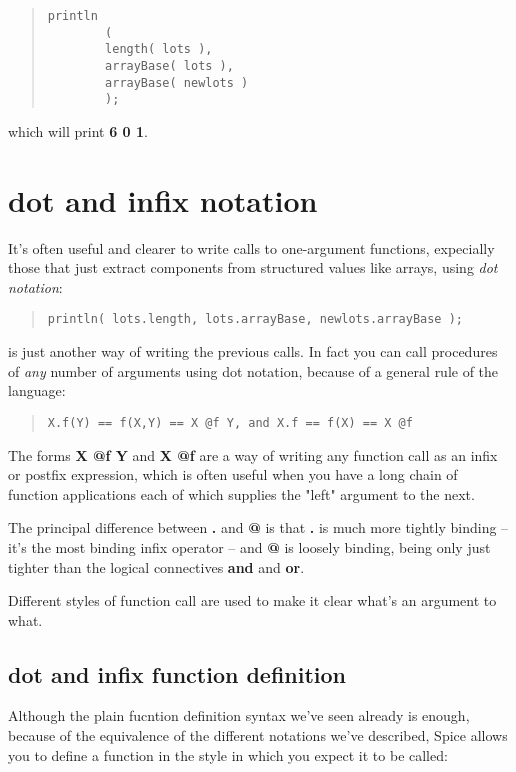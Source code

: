 \documentclass{report}
\begin{document}
\begin{quote}
\begin{verbatim}
println
        (
        length( lots ),
        arrayBase( lots ),
        arrayBase( newlots )
        );
\end{verbatim}
\end{quote}
which will print {\bf 6 0 1}.\chapter{dot and infix notation}


It's often useful and clearer to write calls to one-argument functions,
expecially those that just extract components from structured values like
arrays, using {\em dot notation}:

\begin{quote}
\begin{verbatim}
println( lots.length, lots.arrayBase, newlots.arrayBase );
\end{verbatim}
\end{quote}
is just another way of writing the previous calls. In fact you can call
procedures of {\em any} number of arguments using dot notation, because of a
general rule of the language:

\begin{quote}
\begin{verbatim}
X.f(Y) == f(X,Y) == X @f Y, and X.f == f(X) == X @f
\end{verbatim}
\end{quote}
The forms {\bf X @f Y} and {\bf X @f} are a way of writing any function call as an
infix or postfix expression, which is often useful when you have a long chain
of function applications each of which supplies the "left" argument to the
next.

The principal difference between {\bf .} and {\bf @} is that {\bf .} is much more tightly
binding -- it's the most binding infix operator -- and {\bf @} is loosely binding,
being only just tighter than the logical connectives {\bf and} and {\bf or}.

Different styles of function call are used to make it clear what's an argument to
what.

\section{dot and infix function definition}


Although the plain fucntion definition syntax we've seen already is enough,
because of the equivalence of the different notations we've described,
Spice allows you to define a function in the style in which you expect it
to be called:
\end{document}
